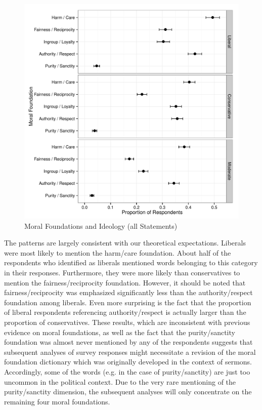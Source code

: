 \documentclass[12pt]{paper}
\begin{document}
\begin{figure}\centering
\includegraphics[scale=.55]{../calc/fig/p1_mft_ideol.pdf}
\caption{Moral Foundations and Ideology (all Statements)}\label{fig:mft_ideol}
\end{figure}

The patterns are largely consistent with our theoretical expectations. Liberals were most likely to mention the harm/care foundation. About half of the respondents who identified as liberals mentioned words belonging to this category in their responses. Furthermore, they were more likely than conservatives to mention the fairness/reciprocity foundation. However, it should be noted that fairness/reciprocity was emphasized significantly less than the authority/respect foundation among liberals. Even more surprising is the fact that the proportion of liberal respondents referencing authority/respect is actually larger than the proportion of conservatives. These results, which are inconsistent with previous evidence on moral foundations, as well as the fact that the purity/sanctity foundation was almost never mentioned by any of the respondents suggests that subsequent analyses of survey responses might necessitate a revision of the moral foundation dictionary which was originally developed in the context of sermons. Accordingly, some of the words (e.g. in the case of purity/sanctity) are just too uncommon in the political context. Due to the very rare mentioning of the purity/sanctity dimension, the subsequent analyses will only concentrate on the remaining four moral foundations.
\end{document}
